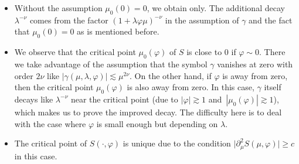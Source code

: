 \documentclass[11pt]{article}
\numberwithin{equation}{section}
\def\c{\gamma}
\def\f{\varphi}
\def\l{\lambda}
\def\m{\mu}
\def\n{\nu}
\def\pa{\partial}
\begin{document}
\begin{Remark}\quad
\begin{itemize}\itemsep=0pt
\item[(1)] Without the assumption $\m_0(0)=0$, we obtain \smash{$I(\l,\f)\lesssim \l^{-\frac{1}{2}}$} only. The additional decay~$\l^{-\n}$ comes from the factor $(1+\l \f\m)^{-\n}$ in the assumption of $\c$ and the fact that $\m_0(0)=0$ as is mentioned before.

\item[(2)] We observe that the critical point $\m_0(\f)$ of $S$ is close to $0$ if $\f\sim 0$. There we take advantage of the assumption that the symbol $\c$ vanishes at zero with order $2\n$ like $|\c(\m,\l,\f)|\lesssim \m^{2\n}$. On the other hand, if $\f$ is away from zero, then the critical point $\m_0(\f)$ is also away from zero. In this case, $\c$ itself decays like $\l^{-\n}$ near the critical point (due to $|\f|\gtrsim 1$ and~${|\m_0(\f)|\gtrsim 1}$), which makes us to prove the improved decay. The difficulty here is to deal with the case where $\f$ is small enough but depending on $\l$.

\item[(3)]
The critical point of $S(\cdot,\f)$ is unique due to the condition $\big|\pa_{\m}^2S(\m,\f)\big|\geq c$ in this case.
\end{itemize}
\end{Remark}
\end{document}
